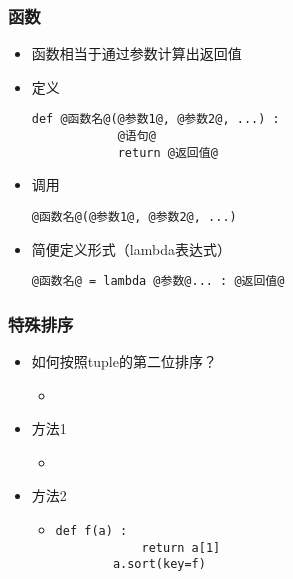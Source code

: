 \begin{frame} [fragile]
	\frametitle{函数}
	\begin{itemize}
	\item 函数相当于通过参数计算出返回值
	\item 定义
		\begin{lstlisting}[style=pythonstyle, gobble=8, texcl, escapechar=@]
		def @函数名@(@参数1@, @参数2@, ...) :
			@语句@
			return @返回值@
		\end{lstlisting}
	\item 调用
		\begin{lstlisting}[style=pythonstyle, gobble=8, texcl, escapechar=@]
		@函数名@(@参数1@, @参数2@, ...)
		\end{lstlisting}
	\item 简便定义形式（lambda表达式）
		\begin{lstlisting}[style=pythonstyle, gobble=8, texcl, escapechar=@]
		@函数名@ = lambda @参数@... : @返回值@
		\end{lstlisting}
	\end{itemize}
\end{frame}

\begin{frame} [fragile]
	\frametitle{特殊排序}
	\linespread{1.25}
	\begin{itemize}
	\item 如何按照tuple的第二位排序？
		\begin{itemize}
		\item {}
		\end{itemize}
	\item 方法1
		\begin{itemize}
		\item {}
		\end{itemize}
	\item 方法2
		\begin{itemize}
		\item
		\begin{lstlisting}[style=pythonstyle, gobble=8, texcl, escapechar=@]
		def f(a) :
			return a[1]
		a.sort(key=f)
		\end{lstlisting}
		\end{itemize}
	\end{itemize}
\end{frame}

